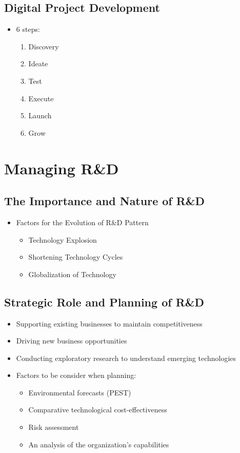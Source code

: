 \documentclass[openany,12pt,a4paper]{book}
\begin{document}
\section{Digital Project Development}
\begin{itemize}
    \item 6 steps:
    \begin{enumerate}
        \item Discovery
        \item Ideate
        \item Test
        \item Execute
        \item Launch
        \item Grow
    \end{enumerate}
\end{itemize}

\chapter{Managing R\&D}
\section{The Importance and Nature of R\&D}
\begin{itemize}
    \item Factors for the Evolution of R\&D Pattern
    \begin{itemize}
        \item Technology Explosion
        \item Shortening Technology Cycles
        \item Globalization of Technology
    \end{itemize}
\end{itemize}
\section{Strategic Role and Planning of R\&D}
\begin{itemize}
    \item Supporting existing businesses to maintain competitiveness
    \item Driving new business opportunities
    \item Conducting exploratory research to understand emerging technologies
    \item Factors to be consider when planning:
    \begin{itemize}
        \item Environmental forecasts (PEST)
        \item Comparative technological cost-effectiveness
        \item Risk assessment
        \item An analysis of the organization's capabilities
    \end{itemize}
\end{itemize}
\end{document}
